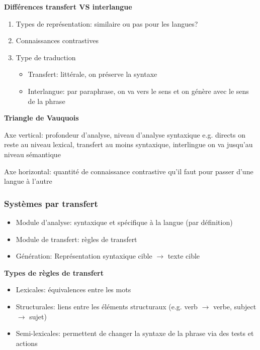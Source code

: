\textbf{Différences transfert VS interlangue}

\begin{enumerate}
    \item Types de représentation: similaire ou pas pour les langues?
    \item Connaissances contrastives
    \item Type de traduction
    \begin{itemize}
        \item Transfert: littérale, on préserve la syntaxe
        \item Interlangue: par paraphrase, on va vers le sens et on génère avec le sens de la phrase
    \end{itemize}
\end{enumerate}

\vspace{1cm}

\textbf{Triangle de Vauquois}

\resizebox{0.85\textwidth}{!}{
    
}

\vspace{1cm}

Axe vertical: profondeur d'analyse, niveau d'analyse syntaxique
    e.g. directs on reste au niveau lexical, transfert au moins syntaxique, interlingue on va jusqu'au niveau sémantique

Axe horizontal: quantité de connaissance contrastive qu'il faut pour passer d'une langue à l'autre \\

\subsubsection{Systèmes par transfert}

\begin{itemize}
    \item Module d'analyse: syntaxique et spécifique à la langue (par définition)
    \item Module de transfert: règles de transfert
    \item Génération: Représentation syntaxique cible $\rightarrow$ texte cible\\
\end{itemize}

\textbf{Types de règles de transfert}

\begin{itemize}
    \item Lexicales: équivalences entre les mots
    \item Structurales: liens entre les éléments structuraux (e.g. verb $\rightarrow$ verbe, subject $\rightarrow$ sujet)
    \item Semi-lexicales: permettent de changer la syntaxe de la phrase via des tests et actions\\
\end{itemize}

